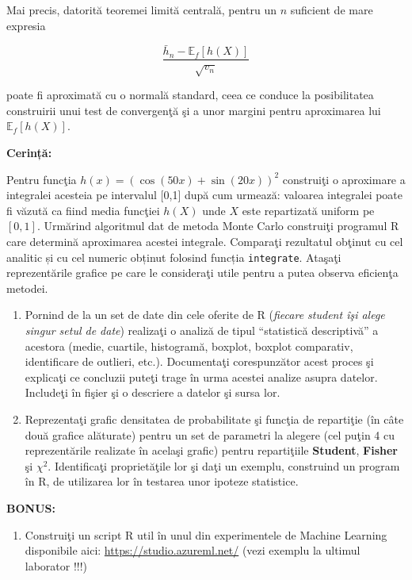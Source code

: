\documentclass[]{article}
\providecommand{\tightlist}{%
  \setlength{\itemsep}{0pt}\setlength{\parskip}{0pt}}
\begin{document}
Mai precis, datorită teoremei limită centrală, pentru un \(n\) suficient
de mare expresia

\[
\frac{\bar{h}_n - \mathbb{E}_{f}[h(X)]}{\sqrt{v_n}}
\]

poate fi aproximată cu o normală standard, ceea ce conduce la
posibilitatea construirii unui test de convergenţă şi a unor margini
pentru aproximarea lui \(\mathbb{E}_{f}[h(X)]\).

\textbf{Cerință:}

Pentru funcţia \(h(x) = \left(\cos(50x) + \sin(20x)\right)^2\)
construiţi o aproximare a integralei acesteia pe intervalul {[}0,1{]}
după cum urmează: valoarea integralei poate fi văzută ca fiind media
funcţiei \(h(X)\) unde \(X\) este repartizată uniform pe \([0,1]\).
Urmărind algoritmul dat de metoda Monte Carlo construiţi programul R
care determină aproximarea acestei integrale. Comparaţi rezultatul
obţinut cu cel analitic și cu cel numeric obținut folosind funcția
\texttt{integrate}. Ataşaţi reprezentările grafice pe care le
consideraţi utile pentru a putea observa eficienţa metodei.

\begin{enumerate}
\def\labelenumi{\arabic{enumi}.}
\setcounter{enumi}{3}
\item
  Pornind de la un set de date din cele oferite de R (\emph{fiecare
  student îşi alege singur setul de date}) realizaţi o analiză de tipul
  ``statistică descriptivă'' a acestora (medie, cuartile, histogramă,
  boxplot, boxplot comparativ, identificare de outlieri, etc.).
  Documentaţi corespunzător acest proces şi explicaţi ce concluzii
  puteţi trage în urma acestei analize asupra datelor. Includeţi în
  fişier şi o descriere a datelor şi sursa lor.
\item
  Reprezentaţi grafic densitatea de probabilitate şi funcţia de
  repartiţie (în câte două grafice alăturate) pentru un set de parametri
  la alegere (cel puţin 4 cu reprezentările realizate în acelaşi grafic)
  pentru repartiţiile \textbf{Student}, \textbf{Fisher} şi \(\chi^2\).
  Identificaţi proprietăţile lor şi daţi un exemplu, construind un
  program în R, de utilizarea lor în testarea unor ipoteze statistice.
\end{enumerate}

\textbf{BONUS:}

\begin{enumerate}
\def\labelenumi{\arabic{enumi}.}
\setcounter{enumi}{5}
\tightlist
\item
  Construiţi un script R util în unul din experimentele de Machine
  Learning disponibile aici: \url{https://studio.azureml.net/} (vezi
  exemplu la ultimul laborator !!!)
\end{enumerate}
\end{document}
